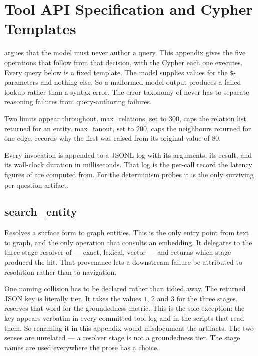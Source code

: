 \chapter{Tool API Specification and Cypher Templates}\label{app:toolapi}


 argues that the model must never author a query. This
appendix gives the five operations that follow from that decision, with the
Cypher each one executes. Every query below is a fixed template. The model
supplies values for the \verb|$|-parameters and nothing else. So a malformed
model output produces a failed lookup rather than a syntax error. The error
taxonomy of  never has to separate reasoning failures
from query-authoring failures.

Two limits appear throughout. \textsf{max\_relations}, set to $300$, caps the
relation list returned for an entity. \textsf{max\_fanout}, set to $200$, caps
the neighbours returned for one edge.  records why the
first was raised from its original value of $80$.

Every invocation is appended to a JSONL log with its arguments, its result, and
its wall-clock duration in milliseconds. That log is the per-call record the
latency figures of  are computed from. For the
determinism probes it is the only surviving per-question artifact.

\section{search\_entity}\label{app:tool-search}

Resolves a surface form to graph entities. This is the only entry point from
text to graph, and the only operation that consults an embedding. It delegates
to the three-stage resolver of  --- exact, lexical,
vector --- and returns which stage produced the hit. That provenance lets a
downstream failure be attributed to resolution rather than to navigation.

One naming collision has to be declared rather than tidied away. The returned
JSON key is literally \textsf{tier}. It takes the values $1$, $2$ and $3$
for the three stages.  reserves that word for the
groundedness metric. This is the sole exception: the key appears verbatim in
every committed tool log and in the scripts that read them. So renaming it in
this appendix would misdocument the artifacts. The two senses are unrelated ---
a resolver stage is not a groundedness tier. The stage names are used
everywhere the prose has a choice.

